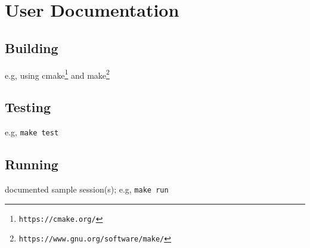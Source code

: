 \documentclass{article}
\begin{document}



\appendix

\section{User Documentation} \label{ch:userdoc}

\subsection{Building}

e.g, using cmake\footnote{\tt https://cmake.org/} and make\footnote{\tt https://www.gnu.org/software/make/}


\subsection{Testing}

e.g, \verb!make test!

\subsection{Running}

documented sample session(s); e.g, \verb!make run!
\end{document}
